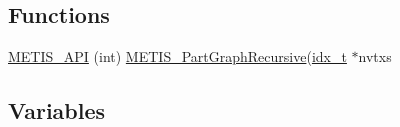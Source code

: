 \subsection*{Functions}
\begin{DoxyCompactItemize}
\item 
\hyperlink{3rd_party_2parmetis-4_80_83_2metis_2include_2metis_8h_a57b80ef4a852110c44a76feb8238c2b4}{M\+E\+T\+I\+S\+\_\+\+A\+PI} (int) \hyperlink{pmetis_8c_a25fc90fd934931239b3c98ac4bdbce76}{M\+E\+T\+I\+S\+\_\+\+Part\+Graph\+Recursive}(\hyperlink{3rd_party_2parmetis-4_80_83_2metis_2include_2metis_8h_aaa5262be3e700770163401acb0150f52}{idx\+\_\+t} $\ast$nvtxs
\end{DoxyCompactItemize}
\subsection*{Variables}

